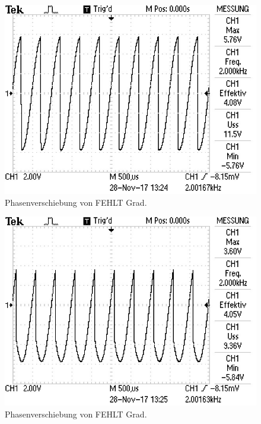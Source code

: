 \begin{figure}
  \centering
  \includegraphics{Phase3.jpg}
  \caption{Phasenverschiebung von FEHLT Grad.}
  \label{fig:Phase3}
\end{figure}

\begin{figure}
  \centering
  \includegraphics{Phase4.jpg}
  \caption{Phasenverschiebung von FEHLT Grad.}
  \label{fig:Phase4}
\end{figure}

